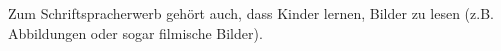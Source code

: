 Zum Schriftspracherwerb gehört auch, dass Kinder lernen, Bilder zu lesen (z.B. Abbildungen oder sogar filmische Bilder).